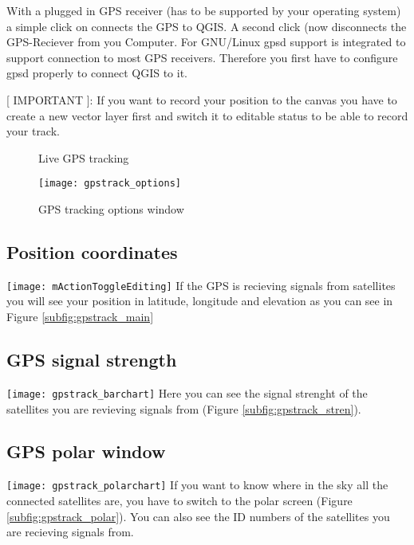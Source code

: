 With a plugged in GPS receiver (has to be supported by your operating system)
a simple click on  connects the GPS to QGIS. A second click
(now  disconnects the GPS-Reciever from you Computer. For 
GNU/Linux gpsd support is integrated to support connection to most GPS 
receivers. Therefore you first have to configure gpsd properly to connect QGIS to it.

[ IMPORTANT ]: If you want to record your position to the canvas you have to
create a new vector layer first and switch it to editable status to be able
to record your track.

\begin{figure}[ht]
\centering
     \hspace{0.33cm}
     \hspace{0.33cm}
\caption{Live GPS tracking \nixcaption} \label{fig:gpstrack_live}
\end{figure}

\begin{figure}[ht]
   \centering
   \texttt{[image: gpstrack\_options]}
   \caption{GPS tracking options window \nixcaption}
   \label{fig:gpstrack_options}
\end{figure}

\subsection{Position coordinates}
\texttt{[image: mActionToggleEditing]} If the GPS is
recieving signals from satellites you will see your position in latitude,
longitude and elevation as you can see in Figure \ref{subfig:gpstrack_main}

\subsection{GPS signal strength}
\texttt{[image: gpstrack\_barchart]} Here you can see
the signal strenght of the satellites you are revieving signals from
(Figure \ref{subfig:gpstrack_stren}).

\subsection{GPS polar window}
\texttt{[image: gpstrack\_polarchart]} If you want
to know where in the sky all the connected satellites are, you have to
switch to the polar screen (Figure \ref{subfig:gpstrack_polar}).
You can also see the ID numbers of the satellites you are recieving signals from.

